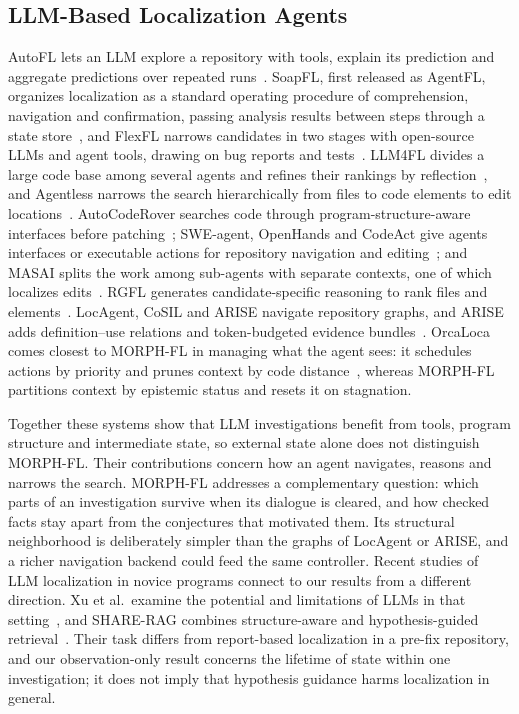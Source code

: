 \documentclass[a4paper,fleqn]{cas-sc}
\newcommand{\tool}{MORPH-FL}
\begin{document}
\subsection{LLM-Based Localization Agents}
AutoFL lets an LLM explore a repository with tools, explain its prediction and aggregate predictions over repeated runs~\citep{autofl2024}. SoapFL, first released as AgentFL, organizes localization as a standard operating procedure of comprehension, navigation and confirmation, passing analysis results between steps through a state store~\citep{soapfl2025}, and FlexFL narrows candidates in two stages with open-source LLMs and agent tools, drawing on bug reports and tests~\citep{flexfl2025}. LLM4FL divides a large code base among several agents and refines their rankings by reflection~\citep{llm4fl2024}, and Agentless narrows the search hierarchically from files to code elements to edit locations~\citep{agentless2025}. AutoCodeRover searches code through program-structure-aware interfaces before patching~\citep{autocoderover2024}; SWE-agent, OpenHands and CodeAct give agents interfaces or executable actions for repository navigation and editing~\citep{sweagent2024,openhands2025,codeact2024}; and MASAI splits the work among sub-agents with separate contexts, one of which localizes edits~\citep{masai2024}. RGFL generates candidate-specific reasoning to rank files and elements~\citep{rgfl2026}. LocAgent, CoSIL and ARISE navigate repository graphs, and ARISE adds definition--use relations and token-budgeted evidence bundles~\citep{locagent2025,cosil2025,arise2026}. OrcaLoca comes closest to \tool{} in managing what the agent sees: it schedules actions by priority and prunes context by code distance~\citep{orcaloca2025}, whereas \tool{} partitions context by epistemic status and resets it on stagnation.

Together these systems show that LLM investigations benefit from tools, program structure and intermediate state, so external state alone does not distinguish \tool{}. Their contributions concern how an agent navigates, reasons and narrows the search. \tool{} addresses a complementary question: which parts of an investigation survive when its dialogue is cleared, and how checked facts stay apart from the conjectures that motivated them. Its structural neighborhood is deliberately simpler than the graphs of LocAgent or ARISE, and a richer navigation backend could feed the same controller. Recent studies of LLM localization in novice programs connect to our results from a different direction. Xu et al.\ examine the potential and limitations of LLMs in that setting~\citep{xu2026novice}, and SHARE-RAG combines structure-aware and hypothesis-guided retrieval~\citep{wu2026sharerag}. Their task differs from report-based localization in a pre-fix repository, and our observation-only result concerns the lifetime of state within one investigation; it does not imply that hypothesis guidance harms localization in general.
\end{document}
